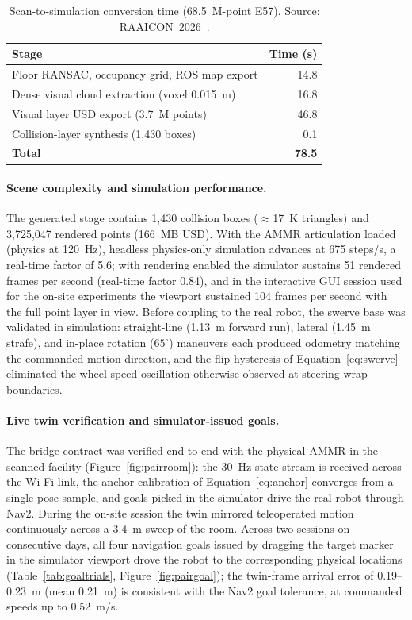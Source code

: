 \begin{table}[htbp]
\centering
\caption{Scan-to-simulation conversion time (68.5~M-point E57). Source:
RAAICON~2026~\cite{raaicon2026}.}
\label{tab:convtime}
\begin{tabular}{l r}
\toprule
\textbf{Stage} & \textbf{Time (s)} \\
\midrule
Floor RANSAC, occupancy grid, ROS map export & 14.8 \\
Dense visual cloud extraction (voxel 0.015~m) & 16.8 \\
Visual layer USD export (3.7~M points) & 46.8 \\
Collision-layer synthesis (1{,}430 boxes) & 0.1 \\
\midrule
\textbf{Total} & \textbf{78.5} \\
\bottomrule
\end{tabular}
\end{table}

\paragraph{Scene complexity and simulation performance.}
The generated stage contains 1{,}430 collision boxes ($\approx$17~K
triangles) and 3{,}725{,}047 rendered points (166~MB USD). With the AMMR
articulation loaded (physics at 120~Hz), headless physics-only simulation
advances at 675 steps/s, a real-time factor of 5.6; with rendering enabled the
simulator sustains 51 rendered frames per second (real-time factor 0.84), and
in the interactive GUI session used for the on-site experiments the viewport
sustained 104 frames per second with the full point layer in view. Before
coupling to the real robot, the swerve base was validated in simulation:
straight-line (1.13~m forward run), lateral (1.45~m strafe), and in-place
rotation ($65^{\circ}$) maneuvers each produced odometry matching the
commanded motion direction, and the flip hysteresis of
Equation~\ref{eq:swerve} eliminated the wheel-speed oscillation otherwise
observed at steering-wrap boundaries.

\paragraph{Live twin verification and simulator-issued goals.}
The bridge contract was verified end to end with the physical AMMR in the
scanned facility (Figure~\ref{fig:pairroom}): the 30~Hz state stream is
received across the Wi-Fi link, the anchor calibration of
Equation~\ref{eq:anchor} converges from a single pose sample, and goals picked
in the simulator drive the real robot through Nav2. During the on-site session
the twin mirrored teleoperated motion continuously across a 3.4~m sweep of the
room. Across two sessions on consecutive days, all four navigation goals
issued by dragging the target marker in the simulator viewport drove the robot
to the corresponding physical locations (Table~\ref{tab:goaltrials},
Figure~\ref{fig:pairgoal}); the twin-frame arrival error of 0.19--0.23~m
(mean 0.21~m) is consistent with the Nav2 goal tolerance, at commanded speeds
up to 0.52~m/s.

